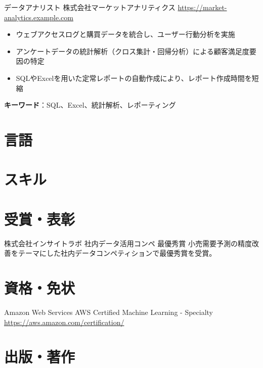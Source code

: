 \documentclass[a4paper, serif, 10pt]{moderncv}
\begin{document}
        {データアナリスト}
        {株式会社マーケットアナリティクス}
        {\url{https://market-analytics.example.com}}
        {}
        {\begin{itemize}
\item ウェブアクセスログと購買データを統合し、ユーザー行動分析を実施
\item アンケートデータの統計解析（クロス集計・回帰分析）による顧客満足度要因の特定
\item SQLやExcelを用いた定常レポートの自動作成により、レポート作成時間を短縮
\end{itemize}
\textbf{キーワード}：SQL、Excel、統計解析、レポーティング}
\section{言語}

\section{スキル}

\section{受賞・表彰}

        {株式会社インサイトラボ}
        {社内データ活用コンペ 最優秀賞}
        {}
        {}
        {小売需要予測の精度改善をテーマにした社内データコンペティションで最優秀賞を受賞。}
\section{資格・免状}

        {Amazon Web Services}
        {AWS Certified Machine Learning - Specialty}
        {\url{https://aws.amazon.com/certification/}}
        {}
        {}
\section{出版・著作}
\end{document}
